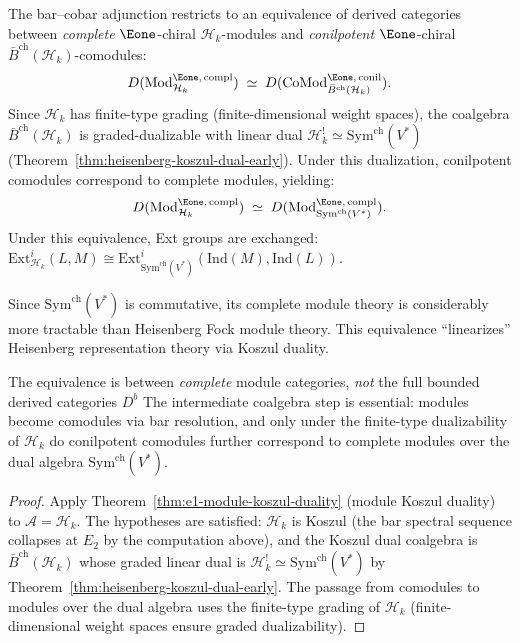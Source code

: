 \begin{corollary}
\label{cor:heisenberg-module-equivalence}
The bar--cobar adjunction restricts to an equivalence of derived categories
between \emph{complete} $\Eone$-chiral $\mathcal{H}_k$-modules and
\emph{conilpotent} $\Eone$-chiral $\bar{B}^{\mathrm{ch}}(\mathcal{H}_k)$-comodules:
\begin{equation}
D(\mathrm{Mod}^{\Eone,\,\mathrm{compl}}_{\mathcal{H}_k})
\;\simeq\;
D(\mathrm{CoMod}^{\Eone,\,\mathrm{conil}}_{\bar{B}^{\mathrm{ch}}(\mathcal{H}_k)}).
\end{equation}
Since $\mathcal{H}_k$ has finite-type grading (finite-dimensional weight spaces),
the coalgebra $\bar{B}^{\mathrm{ch}}(\mathcal{H}_k)$ is graded-dualizable with
linear dual $\mathcal{H}_k^! \simeq \mathrm{Sym}^{\mathrm{ch}}(V^*)$
(Theorem~\ref{thm:heisenberg-koszul-dual-early}). Under this dualization,
conilpotent comodules correspond to complete modules, yielding:
\begin{equation}
D(\mathrm{Mod}^{\Eone,\,\mathrm{compl}}_{\mathcal{H}_k})
\;\simeq\;
D(\mathrm{Mod}^{\Eone,\,\mathrm{compl}}_{\mathrm{Sym}^{\mathrm{ch}}(V^*)}).
\end{equation}
Under this equivalence, Ext groups are exchanged:
$\mathrm{Ext}^i_{\mathcal{H}_k}(L, M) \cong
\mathrm{Ext}^i_{\mathrm{Sym}^{\mathrm{ch}}(V^*)}(\mathrm{Ind}(M), \mathrm{Ind}(L))$.

Since $\mathrm{Sym}^{\mathrm{ch}}(V^*)$ is commutative, its complete module theory
is considerably more tractable than Heisenberg Fock module theory.  This equivalence
``linearizes'' Heisenberg representation theory via Koszul duality.
\end{corollary}

\begin{remark}
The equivalence is between \emph{complete} module categories,
\emph{not} the full bounded derived categories $D^b$
The intermediate
coalgebra step is essential: modules become comodules via bar resolution,
and only under the finite-type dualizability of $\mathcal{H}_k$
do conilpotent comodules further correspond to complete modules over the
dual algebra $\mathrm{Sym}^{\mathrm{ch}}(V^*)$.
\end{remark}

\begin{proof}
Apply Theorem~\ref{thm:e1-module-koszul-duality} (module Koszul duality) to
$\mathcal{A} = \mathcal{H}_k$.  The hypotheses are satisfied: $\mathcal{H}_k$
is Koszul (the bar spectral sequence collapses at $E_2$ by the computation above), and
the Koszul dual coalgebra is $\bar{B}^{\mathrm{ch}}(\mathcal{H}_k)$ whose
graded linear dual is $\mathcal{H}_k^! \simeq \mathrm{Sym}^{\mathrm{ch}}(V^*)$ by
Theorem~\ref{thm:heisenberg-koszul-dual-early}.  The passage from comodules to
modules over the dual algebra uses the finite-type grading of $\mathcal{H}_k$
(finite-dimensional weight spaces ensure graded dualizability).
\end{proof}

